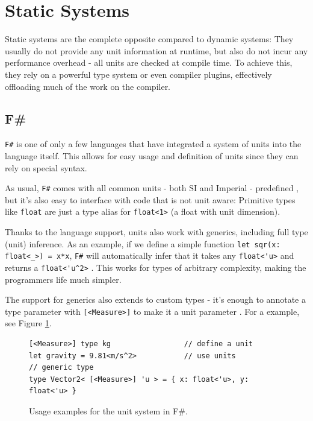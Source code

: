 \documentclass[12pt,oneside,a4paper]{scrbook}
\theoremstyle{definition}
\begin{document}
\section{Static Systems}

Static systems are the complete opposite compared to dynamic systems: They usually do not provide any unit information at runtime, but also do not incur any performance overhead - all units are checked at compile time. To achieve this, they rely on a powerful type system or even compiler plugins, effectively offloading much of the work on the compiler.

\subsection{F\#}

\verb/F#/ is one of only a few languages that have integrated a system of units into the language itself. This allows for easy usage and definition of units since they can rely on special syntax.
\citep{Kennedy08:1}

As usual, \verb/F#/ comes with all common units - both SI and Imperial - predefined \citep{Kennedy08:2}, but it's also easy to interface with code that is not unit aware: Primitive types like \verb/float/ are just a type alias for \verb/float<1>/ (a float with unit dimension).

Thanks to the language support, units also work with generics, including full type (unit) inference. As an example, if we define a simple function \verb/let sqr(x: float<_>) = x*x/, \verb/F#/ will automatically infer that it takes any \verb/float<'u>/ and returns a \verb/float<'u^2>/ \citep{Kennedy08:3}. This works for types of arbitrary complexity, making the programmers life much simpler.

The support for generics also extends to custom types - it's enough to annotate a type parameter with \verb/[<Measure>]/ to make it a unit parameter \citep{Kennedy08:4}. For a example, see Figure \ref{code:fsharp}.


\begin{figure}
\begin{verbatim}
[<Measure>] type kg                 // define a unit
let gravity = 9.81<m/s^2>           // use units
// generic type
type Vector2< [<Measure>] 'u > = { x: float<'u>, y: float<'u> }
\end{verbatim}
\caption{Usage examples for the unit system in F\#.}
\label{code:fsharp}
\end{figure}
\end{document}
